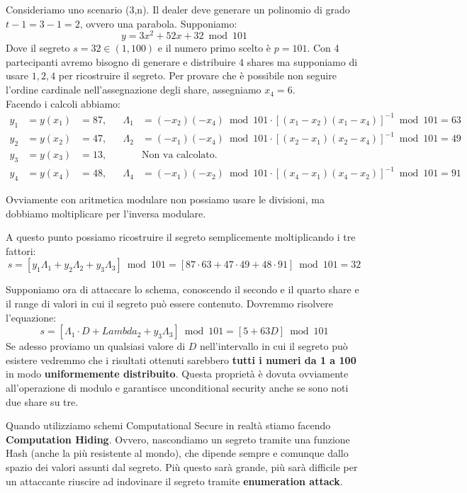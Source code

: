 \begin{example}\label{exam:shamirmodular}
Consideriamo uno scenario (3,n). Il dealer deve generare un polinomio di grado $t-1=3-1=2$, ovvero una parabola. Supponiamo: \[y=3 x^2+52 x+32
   \bmod 101\]
Dove il segreto $s=32\in(1,100)$ e il numero primo scelto è $p=101$. Con 4 partecipanti avremo bisogno di generare e distribuire 4 shares ma supponiamo di usare $1,2,4$ per ricostruire il segreto. Per provare che è possibile non seguire l'ordine cardinale nell'assegnazione degli share, assegniamo $x_4=6$.\\
Facendo i calcoli abbiamo:
\begin{equation*}
    \begin{aligned}
    y_1&=y(x_1)&=87,    &&  \Lambda_1&=(-x_2)(-x_4)\bmod101\cdot[(x_1-x_2)(x_1-x_4)]^{-1}\bmod101=63\\
    y_2&=y(x_2)&=47,    &&  \Lambda_2&=(-x_1)(-x_4)\bmod101\cdot[(x_2-x_1)(x_2-x_4)]^{-1}\bmod101=49\\
    y_3&=y(x_3)&=13,    &&  &\text{Non va calcolato.}\\
    y_4&=y(x_4)&=48,    &&  \Lambda_4&=(-x_1)(-x_2)\bmod101\cdot[(x_4-x_1)(x_4-x_2)]^{-1}\bmod101=91
    \end{aligned}
\end{equation*}
\begin{note}
Ovviamente con aritmetica modulare non possiamo usare le divisioni, ma dobbiamo moltiplicare per l'inversa modulare.
\end{note}
A questo punto possiamo ricostruire il segreto semplicemente moltiplicando i tre fattori:
\[
s=[y_1\Lambda_1+y_2\Lambda_2+y_3\Lambda_3]\bmod101=[87\cdot63+47\cdot49+48\cdot91]\bmod101=32
\]
\begin{remark}
Supponiamo ora di attaccare lo schema, conoscendo il secondo e il quarto share e il range di valori in cui il segreto può essere contenuto. Dovremmo risolvere l'equazione:
\[s=[\Lambda_1\cdot D+Lambda_2+y_3\Lambda_3]\bmod101=[5+63D]\bmod101\]
Se adesso proviamo un qualsiasi valore di $D$ nell'intervallo in cui il segreto può esistere vedremmo che i risultati ottenuti sarebbero \textbf{tutti i numeri da 1 a 100} in modo \textbf{uniformemente distribuito}. Questa proprietà è dovuta ovviamente all'operazione di modulo e garantisce unconditional security anche se sono noti due share su tre. 
\end{remark}
\end{example}\pagebreak
\begin{note}
Quando utilizziamo schemi Computational Secure in realtà stiamo facendo \textbf{Computation Hiding}. Ovvero, nascondiamo un segreto tramite una funzione Hash (anche la più resistente al mondo), che dipende sempre e comunque dallo spazio dei valori assunti dal segreto. Più questo sarà grande, più sarà difficile per un attaccante riuscire ad indovinare il segreto tramite \textbf{enumeration attack}.
\end{note}
